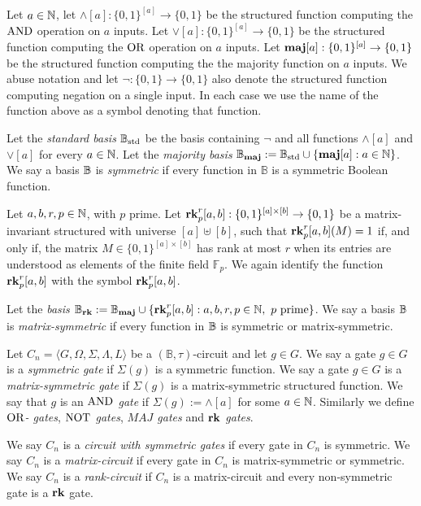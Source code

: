 \documentclass[../paper.tex]{subfiles}
\begin{document}
Let $a \in \mathbb{N}$, let $\land[a] : \{0,1\}^{[a]} \rightarrow \{0,1\}$ be the
structured function computing the $\text{\upshape AND}$ operation on $a$ inputs. Let $\lor[a] :
\{0,1\}^{[a]} \rightarrow \{0,1\}$ be the structured function computing the
$\text{\upshape OR}$ operation on $a$ inputs. Let $\text{\textbf{maj}} [a] : \{0,1\}^{[a]} \rightarrow
\{0,1\}$ be the structured function computing the the majority function on $a$
inputs. We abuse notation and let $\neg : \{0,1\} \rightarrow \{0,1\}$ also
denote the structured function computing negation on a single input. In each
case we use the name of the function above as a symbol denoting that function.

Let the \emph{standard basis} $\mathbb{B}_{\text{std}}$ be the basis containing $\neg$ and all
functions $\land[a]$ and $\lor[a]$ for every $a \in \mathbb{N}$. Let the
\emph{majority basis }$\mathbb{B}_{\text{\textbf{maj}}} := \mathbb{B}_{\text{std}} \cup \{\text{\textbf{maj}}[a] : a \in \mathbb{N}\}$. We say a
basis $\mathbb{B}$ is \emph{symmetric} if every function in $\mathbb{B}$ is a symmetric
Boolean function.

Let $a, b, r, p \in \mathbb{N}$, with $p$ prime. Let $\text{\textbf{rk}}^r_p[a,b] : \{0,1\}^{[a]
  \times [b]} \rightarrow \{0,1\}$ be a matrix-invariant structured with
universe $[a] \uplus [b]$, such that $\text{\textbf{rk}}^r_p[a,b](M) = 1$ if, and only if,
the matrix $M \in \{0,1\}^{[a] \times [b]}$ has rank at most $r$ when its
entries are understood as elements of the finite field $\mathbb{F}_p$. We again
identify the function $\text{\textbf{rk}}^{r}_p[a,b]$ with the symbol $\text{\textbf{rk}}^{r}_p[a,b]$.

Let the \emph{\rank basis} $\mathbb{B}_{\text{\textbf{rk}}} := \mathbb{B}_{\text{\textbf{maj}}} \cup \{\text{\textbf{rk}}^{r}_p[a,b] : a, b, r, p \in
\mathbb{N}, \text{ $p$ prime}\}$. We say a basis $\mathbb{B}$ is \emph{matrix-symmetric} if
every function in $\mathbb{B}$ is symmetric or matrix-symmetric.


Let $C_n = \langle G, \Omega, \Sigma, \Lambda, L \rangle$ be a $(\mathbb{B},
\tau)$-circuit and let $g \in G$. We say a gate $g \in G$ is a \emph{symmetric
  gate} if $\Sigma(g)$ is a symmetric function. We say a gate $g \in G$ is a
\emph{matrix-symmetric gate} if $\Sigma(g)$ is a matrix-symmetric structured
function. We say that $g$ is an \emph{$\text{\upshape AND}$ gate} if $\Sigma(g) := \land [a]$
for some $a \in \mathbb{N}$. Similarly we define \emph{$\text{\upshape OR}$- gates}, \emph{$\text{\upshape NOT}$
  gates}, \emph{$MAJ$ gates} and \emph{$\text{\textbf{rk}}$ gates}.

We say $C_n$ is a \emph{circuit with symmetric gates} if every gate in $C_n$ is
symmetric. We say $C_n$ is a \emph{matrix-circuit} if every gate in $C_n$ is
matrix-symmetric or symmetric. We say $C_n$ is a \emph{rank-circuit} if $C_n$ is a
matrix-circuit and every non-symmetric gate is a $\text{\textbf{rk}}$ gate.
\end{document}
